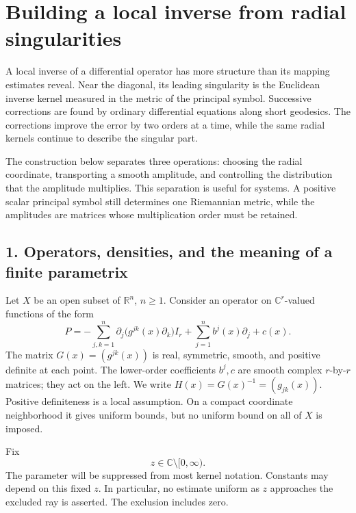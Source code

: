 \documentclass[
  11pt,
]{article}
\author{}
\date{}
\begin{document}
\section{Building a local inverse from radial
singularities}\label{building-a-local-inverse-from-radial-singularities}

A local inverse of a differential operator has more structure than its
mapping estimates reveal. Near the diagonal, its leading singularity is
the Euclidean inverse kernel measured in the metric of the principal
symbol. Successive corrections are found by ordinary differential
equations along short geodesics. The corrections improve the error by
two orders at a time, while the same radial kernels continue to describe
the singular part.

The construction below separates three operations: choosing the radial
coordinate, transporting a smooth amplitude, and controlling the
distribution that the amplitude multiplies. This separation is useful
for systems. A positive scalar principal symbol still determines one
Riemannian metric, while the amplitudes are matrices whose
multiplication order must be retained.

\subsection{1. Operators, densities, and the meaning of a finite
parametrix}\label{operators-densities-and-the-meaning-of-a-finite-parametrix}

Let \(X\) be an open subset of \(\mathbb R^n\), \(n\geq1\). Consider an
operator on \(\mathbb C^r\)-valued functions of the form \[
 P=-\sum_{j,k=1}^n\partial_j\bigl(g^{jk}(x)\partial_k\bigr)I_r
       +\sum_{j=1}^n b^j(x)\partial_j+c(x).                    \tag{H1}
\] The matrix \(G(x)=(g^{jk}(x))\) is real, symmetric, smooth, and
positive definite at each point. The lower-order coefficients \(b^j,c\)
are smooth complex \(r\)-by-\(r\) matrices; they act on the left. We
write \(H(x)=G(x)^{-1}=(g_{jk}(x))\). Positive definiteness is a local
assumption. On a compact coordinate neighborhood it gives uniform
bounds, but no uniform bound on all of \(X\) is imposed.

Fix \[
                         z\in\mathbb C\setminus[0,\infty).     \tag{H2}
\] The parameter will be suppressed from most kernel notation. Constants
may depend on this fixed \(z\). In particular, no estimate uniform as
\(z\) approaches the excluded ray is asserted. The exclusion includes
zero.
\end{document}
